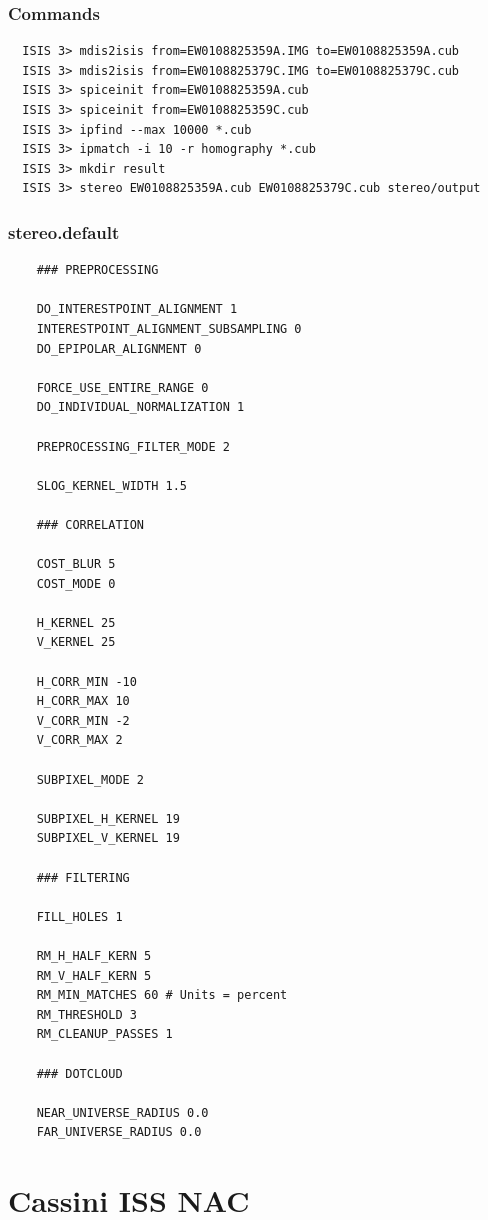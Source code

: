 \subsubsection*{Commands}

\begin{verbatim}
  ISIS 3> mdis2isis from=EW0108825359A.IMG to=EW0108825359A.cub
  ISIS 3> mdis2isis from=EW0108825379C.IMG to=EW0108825379C.cub
  ISIS 3> spiceinit from=EW0108825359A.cub
  ISIS 3> spiceinit from=EW0108825359C.cub
  ISIS 3> ipfind --max 10000 *.cub
  ISIS 3> ipmatch -i 10 -r homography *.cub
  ISIS 3> mkdir result
  ISIS 3> stereo EW0108825359A.cub EW0108825379C.cub stereo/output
\end{verbatim}

\subsubsection*{stereo.default}
\begin{verbatim}
    ### PREPROCESSING

    DO_INTERESTPOINT_ALIGNMENT 1
    INTERESTPOINT_ALIGNMENT_SUBSAMPLING 0
    DO_EPIPOLAR_ALIGNMENT 0

    FORCE_USE_ENTIRE_RANGE 0
    DO_INDIVIDUAL_NORMALIZATION 1

    PREPROCESSING_FILTER_MODE 2

    SLOG_KERNEL_WIDTH 1.5

    ### CORRELATION

    COST_BLUR 5
    COST_MODE 0

    H_KERNEL 25
    V_KERNEL 25

    H_CORR_MIN -10
    H_CORR_MAX 10
    V_CORR_MIN -2
    V_CORR_MAX 2

    SUBPIXEL_MODE 2

    SUBPIXEL_H_KERNEL 19
    SUBPIXEL_V_KERNEL 19

    ### FILTERING

    FILL_HOLES 1

    RM_H_HALF_KERN 5
    RM_V_HALF_KERN 5
    RM_MIN_MATCHES 60 # Units = percent
    RM_THRESHOLD 3
    RM_CLEANUP_PASSES 1

    ### DOTCLOUD

    NEAR_UNIVERSE_RADIUS 0.0
    FAR_UNIVERSE_RADIUS 0.0

\end{verbatim}

\section{Cassini ISS NAC}

